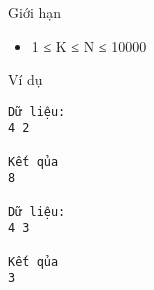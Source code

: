 Giới hạn  
\begin{itemize}
	\item     1 ≤ K ≤  N ≤ 10000   
\end{itemize}
   Ví dụ  
\begin{verbatim}
Dữ liệu:
4 2

Kết qủa
8

Dữ liệu:
4 3

Kết qủa
3
\end{verbatim}